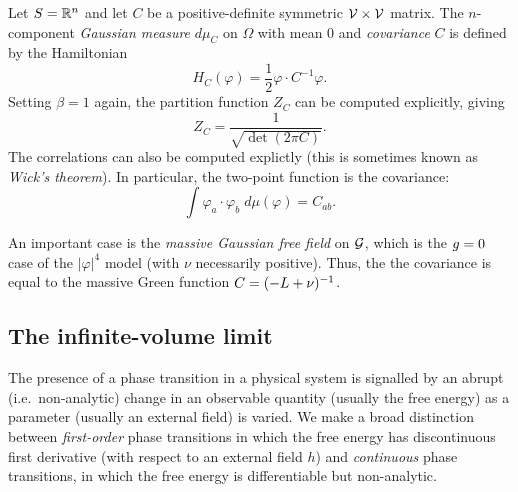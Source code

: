 \begin{example}
Let $S = {\mathbb R}^n$ and let $C$ be a positive-definite symmetric $\mathcal{V}\times\mathcal{V}$
matrix. The $n$-component \emph{Gaussian measure} $d\mu_C$ on
$\Omega$ with mean $0$ and \emph{covariance} $C$ is defined by the Hamiltonian
\begin{equation}
H_C(\varphi) = \frac{1}{2} \varphi \cdot C^{-1} \varphi.
\end{equation}
Setting $\beta = 1$ again, the partition function $Z_C$ can be computed explicitly,
giving
\begin{equation}
Z_C
  =
\frac{1}{\sqrt{\det(2\pi C)}}.
\end{equation}
The correlations can also be computed explictly (this is sometimes known as
\emph{Wick's theorem}). In particular, the two-point function is the covariance:
\begin{equation}
\int \varphi_a \cdot \varphi_b \; d\mu(\varphi) = C_{ab}.
\end{equation}

An important case is the \emph{massive Gaussian free field} on $\mathcal{G}$,
which is the $g = 0$ case of the $|\varphi|^4$ model (with $\nu$ necessarily positive).
Thus, the the covariance is equal to the massive Green function $C = (-L + \nu)^{-1}$.
\end{example}


\subsection{The infinite-volume limit}


The presence of a phase transition in a physical system is signalled by an abrupt
(i.e.\ non-analytic) change in an observable quantity (usually the free energy) as a
parameter (usually an external field) is varied. We make a broad distinction between
\emph{first-order} phase transitions in which the free energy has discontinuous first
derivative (with respect to an external field $h$) and \emph{continuous} phase transitions,
in which the free energy is differentiable but non-analytic.

